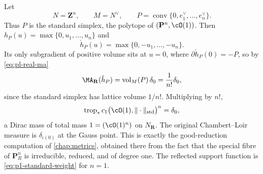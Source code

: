 \begin{example}
\label{ex:ch08-toric-pn}
\leavevmode\par\noindent
Let
\[
 N=\mathbf Z^n,\qquad M=N^\vee,
 \qquad
 P=\operatorname{conv}\{0,e_1^\vee,\ldots,e_n^\vee\}.
\]
Thus $P$ is the standard simplex, the polytope of
$(\mathbf P^n,\cO(1))$.  Then
$h_P(u)=\max\{0,u_1,\ldots,u_n\}$ and
\[
 \check h_P(u)=\max\{0,-u_1,\ldots,-u_n\} .
\]
Its only subgradient of positive volume sits at $u=0$, where
$\partial\check h_P(0)=-P$, so by \eqref{eq:pl-real-ma}
\[
 \MA_{\mathbf R}(\check h_P)=\operatorname{vol}_M(P)\,\delta_0
 =\frac{1}{n!}\delta_0 ,
\]
since the standard simplex has lattice volume $1/n!$.  Multiplying by $n!$,
\[
 \operatorname{trop}_*c_1\bigl(\cO(1),\|\cdot\|_{\mathrm{std}}\bigr)^n
 =\delta_0 ,
\]
a Dirac mass of total mass $1=(\cO(1)^n)$ on $N_{\mathbf R}$.  The original
Chambert--Loir measure is $\delta_{\iota(0)}$ at the Gauss point.  This is
exactly the good-reduction computation of \cref{chap:metrics}, obtained there
from the fact that the special fibre of $\mathbf P^n_R$ is irreducible,
reduced, and of degree one.  The reflected support function is
\eqref{eq:p1-standard-weight} for $n=1$.
\end{example}

